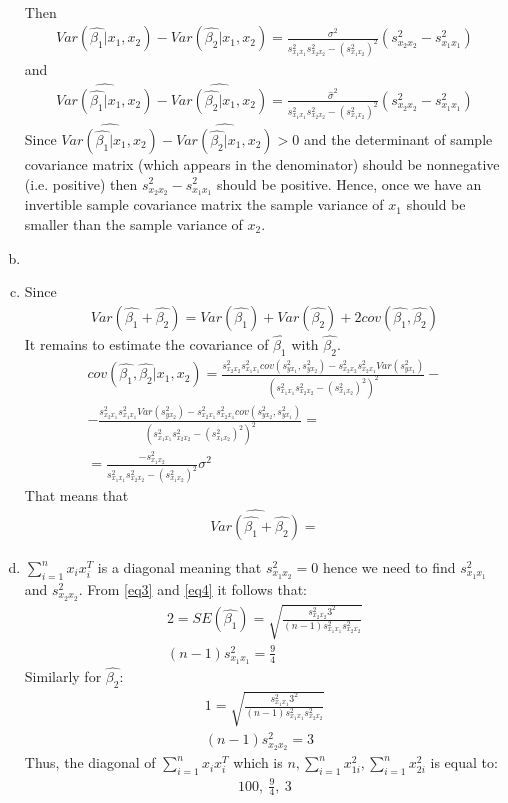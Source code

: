 \documentclass[a4paper]{article}
\newcommand{\summa}{\sum_{i=1}^n}
\begin{document}
\begin{enumerate}[(a)]
\begin{align}
	\end{align}
	Then
	\begin{align*}
	Var(\hat{\beta_1}|x_1, x_2) - Var(\hat{\beta_2}|x_1, x_2) = \frac{\sigma^2}{s^2_{x_1x_1}s^2_{x_2x_2} - (s^2_{x_1x_2})^2} (s^2_{x_2x_2} - s^2_{x_1x_1})
	\end{align*}
	and 
	\begin{align*}
	\widehat{Var(\hat{\beta_1}|x_1, x_2)} - \widehat{Var(\hat{\beta_2}|x_1, x_2)} =\frac{\hat{\sigma}^2}{s^2_{x_1x_1}s^2_{x_2x_2} - (s^2_{x_1x_2})^2} (s^2_{x_2x_2} - s^2_{x_1x_1})
	\end{align*}
	Since $\widehat{Var(\hat{\beta_1}|x_1, x_2)} - \widehat{Var(\hat{\beta_2}|x_1, x_2)} > 0$ and the determinant of sample covariance matrix (which appears in the denominator) should be nonnegative (i.e. positive) then $s^2_{x_2x_2} - s^2_{x_1x_1}$ should be positive. Hence, once we have an invertible sample covariance matrix the sample variance of $x_1$ should be smaller than the sample variance of $x_2$.
	\item 
	\item Since
	\begin{align*}
	Var(\hat{\beta_1} + \hat{\beta_2}) = Var(\hat{\beta_1}) + Var(\hat{\beta_2}) + 2cov(\hat{\beta_1}, \hat{\beta_2})
	\end{align*}
	It remains to estimate the covariance of $\hat{\beta_1}$ with $\hat{\beta_2}$.
	\begin{align*}
	cov(\hat{\beta_1}, \hat{\beta_2}|x_1, x_2) = \frac{s^2_{x_2x_2}s^2_{x_1x_1}cov(s^2_{yx_1}, s^2_{yx_2}) - s^2_{x_2x_2}s^2_{x_2x_1}Var(s^2_{yx_1})}{(s^2_{x_1x_1}s^2_{x_2x_2} - (s^2_{x_1x_2})^2)^2} - \\
	-\frac{ s^2_{x_2x_1}s^2_{x_1x_1}Var(s^2_{yx_2}) - s^2_{x_2x_1}s^2_{x_2x_1}cov(s^2_{yx_2}, s^2_{yx_1})}{(s^2_{x_1x_1}s^2_{x_2x_2} - (s^2_{x_1x_2})^2)^2} = \\
	=\frac{-s^2_{x_1x_2}}{s^2_{x_1x_1}s^2_{x_2x_2} - (s^2_{x_1x_2})^2}\sigma^2
	\end{align*}
	That means that
	\begin{align*}
	\widehat{Var(\hat{\beta_1} + \hat{\beta_2})} = 
	\end{align*}
	\item $\summa x_ix_i^T$ is a diagonal meaning that $s^2_{x_1x_2} = 0$ hence we need to find $s^2_{x_1x_1}$ and $s^2_{x_2x_2}$. From \eqref{eq3} and \eqref{eq4} it follows that:
	\begin{align*}
	2 = SE(\hat{\beta_1}) = \sqrt{\frac{s^2_{x_2x_2}3^2}{(n-1)s^2_{x_1x_1}s^2_{x_2x_2}}}\\
	(n-1)s^2_{x_1x_1} = \frac{9}{4}
	\end{align*}
	Similarly for $\hat{\beta_2}$:
	\begin{align*}
	1 = \sqrt{\frac{s^2_{x_1x_1}3^2}{(n-1)s^2_{x_1x_1}s^2_{x_2x_2}}}\\
	(n-1)s^2_{x_2x_2} = 3
	\end{align*}
	Thus, the diagonal of $\summa x_ix_i^T$ which is $n, \summa x_{1i}^2, \summa x_{2i}^2$ is equal to:
	\begin{align*}
	100,\ \frac{9}{4},\ 3
	\end{align*}
\end{enumerate}
\end{document}

